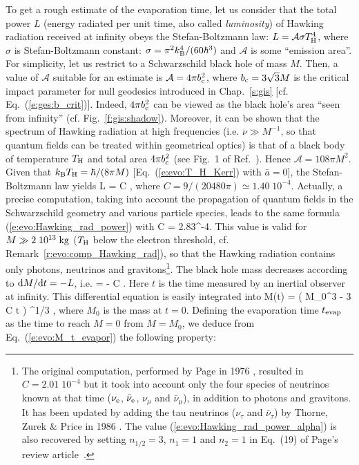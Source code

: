 To get a rough estimate of the evaporation time, let us consider
that the total power $L$
(energy radiated per unit time, also called \emph{luminosity}) of Hawking radiation received at infinity
obeys the Stefan-Boltzmann law:
$L = \mathcal{A} \sigma T_{\rm H}^4$, where $\sigma$ is Stefan-Boltzmann constant:
$\sigma = \pi^2 k_{\rm B}^4/(60 \hbar^3)$ and $\mathcal{A}$ is some ``emission area''.
For simplicity, let us restrict to a Schwarzschild black hole of mass $M$. Then, a
value of $\mathcal{A}$ suitable for an estimate is
$\mathcal{A} = 4\pi b_{\rm c}^2$, where
$b_{\rm c} = 3\sqrt{3} M$ is the critical impact parameter for null geodesics
introduced in Chap.~\ref{s:gis} [cf. Eq.~(\ref{e:ges:b_crit})]. Indeed, $4 \pi b_{\rm c}^2$
can be viewed as the black hole's area ``seen from infinity'' (cf. Fig.~\ref{f:gis:shadow}).
Moreover, it can be shown that the spectrum of Hawking radiation at high frequencies (i.e. $\nu \gg M^{-1}$, so that quantum fields can be treated within geometrical optics) is that of a black
body of temperature $T_{\rm H}$ and total area $4\pi b_{\rm c}^2$ (see Fig.~1 of Ref.~\cite{Page76}). Hence
$\mathcal{A} = 108\pi M^2$. Given that
$k_{\rm B} T_{\rm H} = \hbar/(8\pi M)$ [Eq.~(\ref{e:evo:T_H_Kerr}) with $\bar{a}=0$],
the Stefan-Boltzmann law yields
\be \label{e:evo:Hawking_rad_power}
    L = C  ,
\ee
where $C = 9 / (20480\pi) \simeq 1.40\; 10^{-4}$.
Actually, a precise computation, taking
into account the propagation of quantum fields in the Schwarzschild geometry
and various particle species,
leads to the same formula (\ref{e:evo:Hawking_rad_power}) with \cite{ThornZP86,Page76,Page05}
\be \label{e:evo:Hawking_rad_power_alpha}
    C = 2.83^{-4}.
\ee
This value is valid for $M \gg 2\; 10^{13} {\rm\; kg}$ ($T_{\rm H}$
below the electron threshold, cf. Remark~\ref{r:evo:comp_Hawking_rad}), so that the Hawking radiation
contains only photons, neutrinos and gravitons\footnote{The original computation,
performed by Page in 1976 \cite{Page76}, resulted
in $C=2.01\; 10^{-4}$ but it took into account only the four species
of neutrinos known at that time ($\nu_{\rm e}$, $\bar{\nu}_{\rm e}$, $\nu_\mu$ and
$\bar{\nu}_\mu$), in addition to photons and gravitons. It has been updated
by adding the tau neutrinos ($\nu_\tau$ and $\bar{\nu}_\tau$)
by Thorne, Zurek \& Price in 1986 \cite{ThornZP86}.
The value (\ref{e:evo:Hawking_rad_power_alpha}) is also recovered by
setting $n_{1/2}=3$, $n_1=1$ and $n_2=1$ in Eq.~(19) of Page's review article~\cite{Page05}.}.
The black hole mass decreases according to $\mathrm{d} M/\mathrm{d} t = - L$, i.e.
\be \label{e:evo:Hawking_rad_mass_decrease}
     = - C  .
\ee
Here $t$ is the time measured by an inertial observer at infinity.
This differential equation is easily integrated into
\be \label{e:evo:M_t_evapor}
    M(t) = \left( M_0^3 - 3 C \hbar t \right) ^{1/3} ,
\ee
where $M_0$ is the mass at $t=0$. Defining the evaporation time $t_{\rm evap}$
as the time to reach $M=0$ from $M = M_0$, we deduce from Eq.~(\ref{e:evo:M_t_evapor}) the
following property:


